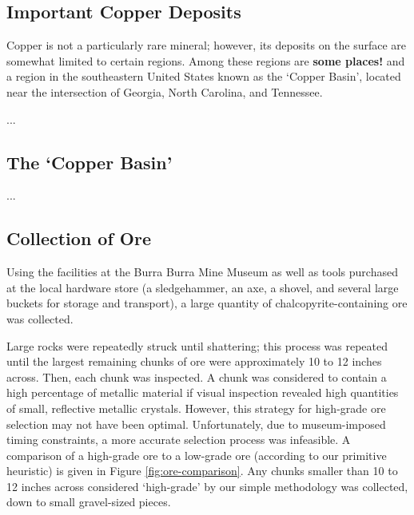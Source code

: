 


\subsection{Important Copper Deposits}

Copper is not a particularly rare mineral; however, its deposits on the surface
are somewhat limited to certain regions.  Among these regions are \textbf{some
places!} and a region in the southeastern United States known as the `Copper
Basin', located near the intersection of Georgia, North Carolina, and Tennessee.

...

\subsection{The `Copper Basin'}

...

\subsection{Collection of Ore}

Using the facilities at the Burra Burra Mine Museum as well as tools purchased
at the local hardware store (a sledgehammer, an axe, a shovel, and several large
buckets for storage and transport), a large quantity of chalcopyrite-containing
ore was collected.

Large rocks were repeatedly struck until shattering; this process was repeated
until the largest remaining chunks of ore were approximately 10 to 12 inches
across.  Then, each chunk was inspected.  A chunk was considered to contain a
high percentage of metallic material if visual inspection revealed high
quantities of small, reflective metallic crystals.  However, this strategy for
high-grade ore selection may not have been optimal.  Unfortunately, due to
museum-imposed timing constraints, a more accurate selection process was
infeasible.  A comparison of a high-grade ore to a low-grade ore (according to
our primitive heuristic) is given in Figure \ref{fig:ore-comparison}.  Any
chunks smaller than 10 to 12 inches across considered `high-grade' by our simple
methodology was collected, down to small gravel-sized pieces.

